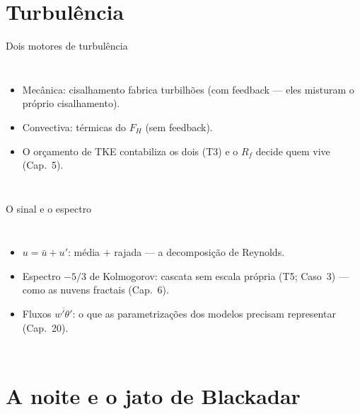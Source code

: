 \documentclass[aspectratio=169,11pt]{beamer}
\begin{document}
\section{Turbulência}

\begin{frame}{Dois motores de turbulência}
  \begin{columns}
    \begin{itemize}
      \item \alert{Mecânica}: cisalhamento fabrica turbilhões
            (com feedback — eles misturam o próprio cisalhamento).
      \item \alert{Convectiva}: térmicas do $F_H$ (sem feedback).
      \item O orçamento de TKE contabiliza os dois (T3) e o $R_f$
            decide quem vive (Cap.~5).
    \end{itemize}
  \end{columns}
\end{frame}

\begin{frame}{O sinal e o espectro}
  \begin{columns}
    \begin{itemize}
      \item $u = \bar u + u'$: média $+$ rajada — a decomposição de
            Reynolds.
      \item Espectro $-5/3$ de Kolmogorov: cascata sem escala própria
            (T5; Caso~3) — como as nuvens fractais (Cap.~6).
      \item Fluxos $\overline{w'\theta'}$: o que as parametrizações
            dos modelos precisam representar (Cap.~20).
    \end{itemize}
  \end{columns}
\end{frame}

\section{A noite e o jato de Blackadar}
\end{document}
